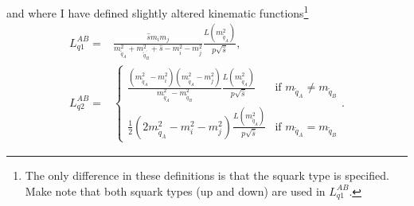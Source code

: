 \documentclass[../main.tex]{subfiles}
\begin{document}
and where I have defined slightly altered kinematic functions\footnote{The only difference in these definitions is that the squark type is specified. Make note that both squark types (up and down) are used in \(L_{q1}^{AB}\).}
\begin{align}
  L_{q1}^{AB} = & \frac{\hat{s} m_i m_j}{m_{\tilde{q}_A}^2 + m_{\tilde{q}^\prime_B}^2 + \hat{s} - m_i^2 - m_j^2} \frac{L(m_{\tilde{q}_A}^2)}{p \sqrt{\hat{s}}},                                                                                                                                                                                                                                                                                                                                                                                                                \\
  L_{q2}^{AB} = & \begin{cases}\frac{(m_{\tilde{q}_A}^2-m_i^2)(m_{\tilde{q}_A}^2-m_j^2)}{m_{\tilde{q}_A}^2-m_{\tilde{q}_B}^2} \frac{L(m_{\tilde{q}_A}^2)}{p \sqrt{\hat{s}}} & \text{if } m_{\tilde{q}_A} \neq m_{\tilde{q}_B} \\ \frac{1}{2}(2 m_{\tilde{q}_A}^2 - m_i^2 - m_j^2) \frac{L(m_{\tilde{q}_A}^2)}{p \sqrt{\hat{s}}} & \text{if } m_{\tilde{q}_A} = m_{\tilde{q}_B} \end{cases}.
\end{align}
\end{document}
